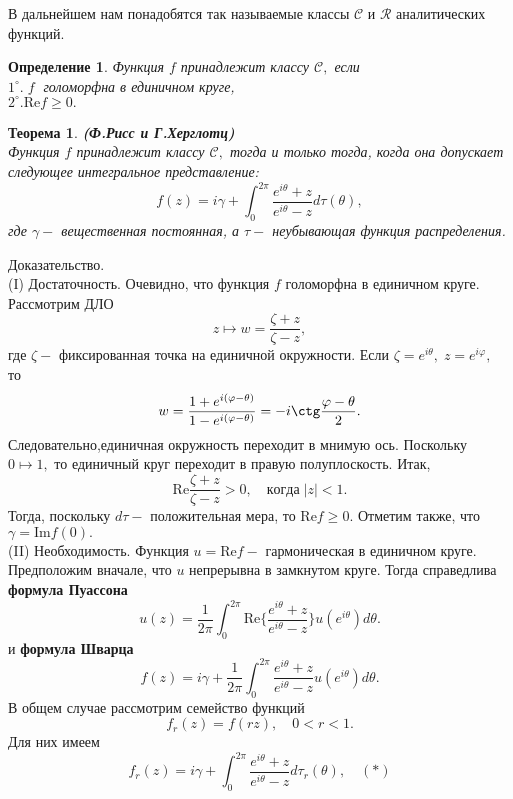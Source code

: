 \documentclass[12pt,a4paper]{article}
\theoremstyle{plain}   \newtheorem{Pro}{Задача}
\newtheorem{Def}{Определение}
\newtheorem{The}{Теорема}
\begin{document}
В дальнейшем нам понадобятся так называемые классы
$ \mathcal{C} $
и
$ \mathcal{R} $
аналитических функций.
\begin{Def}
Функция
$ f $
принадлежит классу
$ \mathcal{C}, $
если\\
$ 1^{\circ}. \; f \; $
голоморфна в единичном круге, \\
$ 2^{\circ}. \mathrm{Re} f \geq 0. $
\end{Def}
\begin{The}
{\bfseries (Ф.Рисс и Г.Херглотц)}
\\
Функция
$ f $
принадлежит классу
$ \mathcal{C} , $
тогда и только тогда, когда она допускает следующее
интегральное представление:
$$
  f(z)=i \gamma + \int _0 ^{2 \pi }
  \frac{e^{i \theta}+z}{e^{i \theta}-z} d \tau ( \theta ),
$$
где
$ \gamma - $
вещественная постоянная, а
$ \tau - $
неубывающая функция распределения.
\end{The}
{\Large Доказательство.}
\\
{\Large (I) Достаточность.}
Очевидно, что функция
$ f $
голоморфна в единичном круге.\\
Рассмотрим ДЛО
$$
  z \mapsto w=\frac{\zeta +z}{\zeta -z},
$$
где
$ \zeta - $
фиксированная точка на единичной окружности. Если
$ \zeta = e^{i \theta}, \;z=e^{i \varphi}, \; $
то
$$
  w=\frac{1+e^{i(\varphi - \theta )}}
  {1-e^{i(\varphi- \theta )}}=
  -i \ctg \frac{\varphi - \theta}{2}.
$$
Следовательно,единичная окружность переходит в мнимую ось.
Поскольку
$ 0 \mapsto 1 , $
то единичный круг переходит в правую полуплоскость. Итак,
$$
  \mathrm{Re} \frac{\zeta+z}{\zeta -z} >0, \quad когда \; |z|<1.
$$
Тогда, поскольку
$ d \tau - $
положительная мера, то
$ \mathrm{Re} f \geq 0. $
Отметим также, что
$ \gamma =\mathrm{Im} f(0). $
\\
{\Large (II) Необходимость.}
Функция
$ u=\mathrm{Re}f - $
гармоническая в единичном круге. Предположим вначале, что
$ u $
непрерывна в замкнутом круге. Тогда справедлива
{\bfseries формула Пуассона}
$$
  u(z)=\frac{1}{2\pi } \int _0 ^{2\pi} \mathrm{Re}
  \biggl \{ \frac{e^{i \theta} +z}{e^{i \theta} -z}
  \biggr \} u(e^{i \theta})d \theta .
$$
и
{\bfseries формула Шварца}
$$
  f(z)=i \gamma +\frac{1}{2\pi}\int _0 ^{2\pi}
  \frac{e^{i\theta} +z}{e^{i\theta} -z} u(e^{i\theta})d\theta .
$$
В общем случае рассмотрим семейство функций
$$
  f_r (z)=f(rz), \quad 0<r<1.
$$
Для них имеем
$$
  f_r (z)=i\gamma + \int _0 ^{2\pi}
  \frac{e^{i\theta} +z}{e^{i\theta} -z} d \tau _r (\theta ),
  \quad (\ast)
$$
\end{document}
